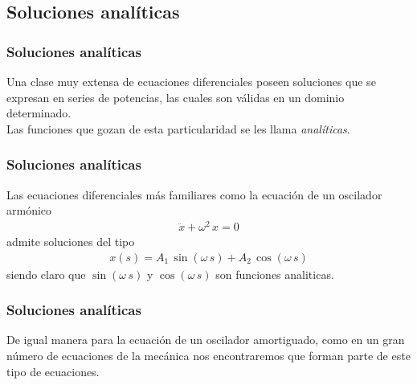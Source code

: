 \subsection{Soluciones analíticas}
\begin{frame}
\frametitle{Soluciones analíticas}
Una clase muy extensa de ecuaciones diferenciales poseen soluciones que se expresan en series de potencias, las cuales son válidas en un dominio determinado.
\\
\bigskip
Las funciones que gozan de esta particularidad se les llama \emph{analíticas}.
\end{frame}
\begin{frame}
\frametitle{Soluciones analíticas}
 Las ecuaciones diferenciales más familiares como la ecuación de un oscilador armónico
 \begin{align*}
\ddot{x} + \omega^{2} \, x = 0
 \end{align*}
\pause
 admite soluciones del tipo
\begin{align*}
x(s) = A_{1} \, \sin( \omega \, s) + A_{2} \, \cos (\omega \, s)
\end{align*}
siendo claro que $\sin( \omega \, s)$ y $\cos( \omega \, s)$ son funciones analiticas.
\end{frame}
\begin{frame}
\frametitle{Soluciones analíticas}
De igual manera para la ecuación de un oscilador amortiguado, como en un gran número de ecuaciones de la mecánica nos encontraremos que forman parte de este tipo de ecuaciones.
\end{frame}
